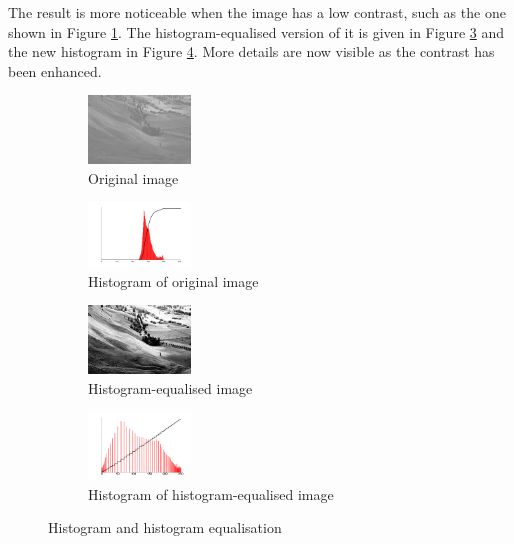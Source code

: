 \documentclass{article}
\begin{document}
The result is more noticeable when the image has a low contrast, such as the one shown in Figure \ref{C original}. The histogram-equalised version of it is given in Figure \ref{C equalised} and the new histogram in Figure \ref{C equalised histogram}. More details are now visible as the contrast has been enhanced.

\begin{figure}
    \centering
    \begin{subfigure}{\textwidth}
        \centering
        \includegraphics[width=0.3\textwidth]{Images/C original.jpg}
        \caption{Original image}
        \label{C original}
    \end{subfigure}
    \begin{subfigure}{\textwidth}
        \centering
        \includegraphics[width=0.3\textwidth]{Images/C original histogram.png}
        \caption{Histogram of original image}
        \label{C original histogram}
    \end{subfigure}
    \begin{subfigure}{\textwidth}
        \centering
        \includegraphics[width=0.3\textwidth]{Images/C equalised.jpg}
        \caption{Histogram-equalised image}
        \label{C equalised}
    \end{subfigure}
    \begin{subfigure}{\textwidth}
        \centering
        \includegraphics[width=0.3\textwidth]{Images/C equalised histogram.png}
        \caption{Histogram of histogram-equalised image}
        \label{C equalised histogram}
    \end{subfigure}
    \caption{Histogram and histogram equalisation \cite{Histogram equalisation wiki}}
    \label{Histogram and histogram equalisation}
\end{figure}
\end{document}
